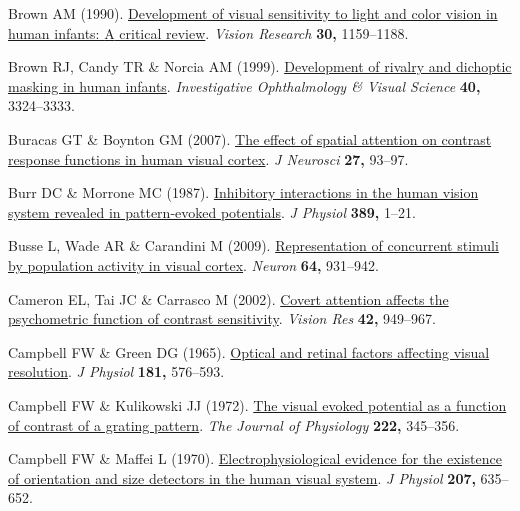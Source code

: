 \documentclass[
  letterpaper,
  DIV=11,
  numbers=noendperiod]{scrartcl}
\newlength{\cslhangindent}
\newenvironment{CSLReferences}[2] %
 {\begin{list}{}{%
  \setlength{\itemindent}{0pt}
  \setlength{\leftmargin}{0pt}
  \setlength{\parsep}{0pt}
  \ifodd #1
   \setlength{\leftmargin}{\cslhangindent}
   \setlength{\itemindent}{-1\cslhangindent}
  \fi
  \setlength{\itemsep}{#2\baselineskip}}}
 {\end{list}}
\begin{document}
\begin{CSLReferences}{1}{1}
Brown AM (1990).
\href{https://doi.org/10.1016/0042-6989(90)90173-I}{Development of
visual sensitivity to light and color vision in human infants: {A}
critical review}. \emph{Vision Research} \textbf{30,} 1159--1188.

Brown RJ, Candy TR \& Norcia AM (1999).
\href{https://www.ncbi.nlm.nih.gov/pubmed/10586959}{Development of
rivalry and dichoptic masking in human infants}. \emph{Investigative
Ophthalmology \& Visual Science} \textbf{40,} 3324--3333.

Buracas GT \& Boynton GM (2007).
\href{https://doi.org/10.1523/JNEUROSCI.3162-06.2007}{The effect of
spatial attention on contrast response functions in human visual
cortex}. \emph{J Neurosci} \textbf{27,} 93--97.

Burr DC \& Morrone MC (1987).
\href{https://doi.org/10.1113/jphysiol.1987.sp016643}{Inhibitory
interactions in the human vision system revealed in pattern-evoked
potentials}. \emph{J Physiol} \textbf{389,} 1--21.

Busse L, Wade AR \& Carandini M (2009).
\href{https://doi.org/10.1016/j.neuron.2009.11.004}{Representation of
concurrent stimuli by population activity in visual cortex}.
\emph{Neuron} \textbf{64,} 931--942.

Cameron EL, Tai JC \& Carrasco M (2002).
\href{https://doi.org/10.1016/s0042-6989(02)00039-1}{Covert attention
affects the psychometric function of contrast sensitivity}. \emph{Vision
Res} \textbf{42,} 949--967.

Campbell FW \& Green DG (1965).
\href{https://doi.org/10.1113/jphysiol.1965.sp007784}{Optical and
retinal factors affecting visual resolution}. \emph{J Physiol}
\textbf{181,} 576--593.

Campbell FW \& Kulikowski JJ (1972).
\href{https://doi.org/10.1113/jphysiol.1972.sp009801}{The visual evoked
potential as a function of contrast of a grating pattern}. \emph{The
Journal of Physiology} \textbf{222,} 345--356.

Campbell FW \& Maffei L (1970).
\href{https://doi.org/10.1113/jphysiol.1970.sp009085}{Electrophysiological
evidence for the existence of orientation and size detectors in the
human visual system}. \emph{J Physiol} \textbf{207,} 635--652.


\end{CSLReferences}
\end{document}
